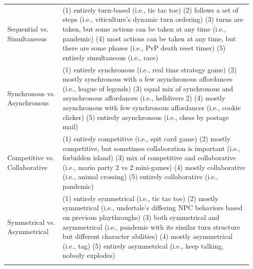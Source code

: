 \begin{table}[t]
\begin{tabular}{p{}p{}}
Sequential vs. Simultaneous & (1) entirely turn-based (i.e., tic tac toe) \newline (2) follows a set of steps (i.e., viticulture's dynamic turn ordering) \newline (3) turns are taken, but some actions can be taken at any time (i.e., pandemic) \newline (4) most actions can be taken at any time, but there are some phases (i.e., PvP death reset timer) \newline (5) entirely simultaneous (i.e., race) \\ \addlinespace
Synchronous vs. Asynchronous & (1) entirely synchronous (i.e., real time strategy game) \newline (2) mostly synchronous with a few asynchronous affordances (i.e., league of legends) \newline (3) equal mix of synchronous and asynchronous affordances (i.e., helldivers 2) \newline (4) mostly asynchronous with few synchronous affordances (i.e., cookie clicker) \newline (5) entirely asynchronous (i.e., chess by postage mail) \\ \addlinespace
Competitive vs. Collaborative & (1) entirely competitive (i.e., spit card game) \newline (2) mostly competitive, but sometimes collaboration is important (i.e., forbidden island) \newline (3) mix of competitive and collaborative (i.e., mario party 2 vs 2 mini-games) \newline (4) mostly collaborative (i.e., animal crossing) \newline (5) entirely collaborative (i.e., pandemic) \\ \addlinespace
Symmetrical vs. Asymmetrical & (1) entirely symmetrical (i.e., tic tac toe) \newline (2) mostly symmetrical (i.e., undertale's differing NPC behaviors based on previous playthroughs) \newline (3) both symmetrical and asymmetrical (i.e., pandemic with its similar turn structure but different character abilities) \newline (4) mostly asymmetrical (i.e., tag) \newline (5) entirely asymmetrical (i.e., keep talking, nobody explodes) \\ \addlinespace
\bottomrule
\end{tabular}
\end{table}
